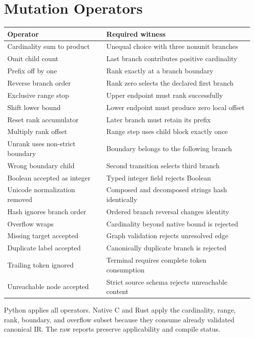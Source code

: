 \section{Mutation Operators}
\begin{longtable}{p{.27\linewidth}p{.63\linewidth}}
\toprule
Operator & Required witness \\
\midrule
Cardinality sum to product & Unequal choice with three nonunit branches \\
Omit child count & Last branch contributes positive cardinality \\
Prefix off by one & Rank exactly at a branch boundary \\
Reverse branch order & Rank zero selects the declared first branch \\
Exclusive range stop & Upper endpoint must rank successfully \\
Shift lower bound & Lower endpoint must produce zero local offset \\
Reset rank accumulator & Later branch must retain its prefix \\
Multiply rank offset & Range step uses child block exactly once \\
Unrank uses non-strict boundary & Boundary belongs to the following branch \\
Wrong boundary child & Second transition selects third branch \\
Boolean accepted as integer & Typed integer field rejects Boolean \\
Unicode normalization removed & Composed and decomposed strings hash identically \\
Hash ignores branch order & Ordered branch reversal changes identity \\
Overflow wraps & Cardinality beyond native bound is rejected \\
Missing target accepted & Graph validation rejects unresolved edge \\
Duplicate label accepted & Canonically duplicate branch is rejected \\
Trailing token ignored & Terminal requires complete token consumption \\
Unreachable node accepted & Strict source schema rejects unreachable content \\
\bottomrule
\end{longtable}
Python applies all operators. Native C and Rust apply the cardinality, range, rank, boundary, and overflow subset because they consume already validated canonical IR. The raw reports preserve applicability and compile status.
